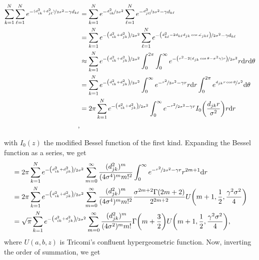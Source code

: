 \documentclass{article}
\begin{document}
\begin{align*}
    \sum_{k=1}^N\sum_{\ell=1}^N e^{-\nicefrac{(d_{ik}^2+ d_{j\ell}^2)}{2\sigma^2}-\gamma d_{k\ell}} &= \sum_{k=1}^Ne^{-\nicefrac{d_{ik}^2}{2\sigma^2}}\sum_{\ell=1}^N e^{-\nicefrac{d_{j\ell}^2}{2\sigma^2}-\gamma d_{k\ell}}\\
    &= \sum_{k=1}^Ne^{-\nicefrac{\qty(d_{ik}^2+d_{jk}^2)}{2\sigma^2}}\sum_{\ell=1}^N e^{-\nicefrac{\qty( d_{k\ell}^2-2d_{k\ell}d_{jk}\cos\angle_{jk\ell})}{2\sigma^2}-\gamma d_{k\ell}}\\
    &\approx \sum_{k=1}^Ne^{-\nicefrac{\qty(d_{ik}^2+d_{jk}^2)}{2\sigma^2}}\int_{0}^{2\pi}\int_{0}^\infty e^{-\nicefrac{\qty( r^2-2(d_{jk}\cos\theta-\sigma^2\gamma) r)}{2\sigma^2}} r \dd r \dd \theta\\
    &= \sum_{k=1}^Ne^{-\nicefrac{\qty(d_{ik}^2+d_{jk}^2)}{2\sigma^2}}\int_{0}^\infty e^{-\nicefrac{r^2}{2\sigma^2}-\gamma r} r \dd r \int_{0}^{2\pi}e^{\nicefrac{d_{jk} r \cos \theta}{\sigma^2}}\dd \theta\\
    &= 2\pi\sum_{k=1}^Ne^{-\nicefrac{\qty(d_{ik}^2+d_{jk}^2)}{2\sigma^2}}\int_{0}^\infty e^{-\nicefrac{r^2}{2\sigma^2}-\gamma r} I_0\qty(\frac{d_{jk}r}{\sigma^2})r \dd r\\,
\end{align*}
\raggedright
with $I_0(z)$ the modified Bessel function of the first kind. Expanding the Bessel function as a series, we get
\begin{align*}
    &= 2\pi\sum_{k=1}^Ne^{-\nicefrac{\qty(d_{ik}^2+d_{jk}^2)}{2\sigma^2}}\sum_{m=0}^\infty \frac{(d_{jk}^2)^m}{(4\sigma^4)^m m!^2}\int_{0}^\infty e^{-\nicefrac{r^2}{2\sigma^2}-\gamma r} r^{2m+1} \dd r\\
    &= 2\pi\sum_{k=1}^Ne^{-\nicefrac{\qty(d_{ik}^2+d_{jk}^2)}{2\sigma^2}}\sum_{m=0}^\infty \frac{(d_{jk}^2)^m}{(4\sigma^4)^m m!^2}\frac{\sigma^{2m+2} \Gamma(2m+2)}{2^{2m+2}}U\qty(m+1, \frac{1}{2}, \frac{\gamma^2\sigma^2}{4})\\
    &= \sqrt{\pi}\sum_{k=1}^Ne^{-\nicefrac{\qty(d_{ik}^2+d_{jk}^2)}{2\sigma^2}}\sum_{m=0}^\infty \frac{(d_{jk}^2)^m}{(4\sigma^2)^{m} m!} \Gamma\qty(m+\frac{3}{2}){}U\qty(m+1, \frac{1}{2}, \frac{\gamma^2\sigma^2}{4}),
\end{align*}
where $U(a, b, z)$ is Tricomi's confluent hypergeometric function. Now, inverting the order of summation, we get
\end{document}
